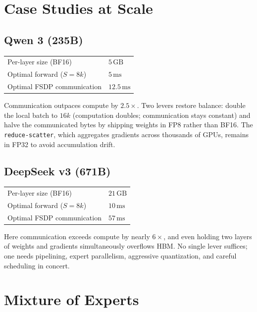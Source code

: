 \documentclass[11pt,a4paper]{article}
\theoremstyle{definition}
\theoremstyle{remark}
\theoremstyle{plain}
\newcommand{\GB}{\,\text{GB}}
\newcommand{\ms}{\,\text{ms}}
\begin{document}
\section{Case Studies at Scale}
\label{sec:cases}

\subsection{Qwen 3 (235B)}
\begin{center}
\begin{tabular}{ll}
\toprule
Per-layer size (BF16)              & $5\GB$ \\
Optimal forward ($S = 8k$)         & $5\ms$ \\
Optimal FSDP communication         & $12.5\ms$ \\
\bottomrule
\end{tabular}
\end{center}
Communication outpaces compute by $2.5 \times$. Two levers restore balance: double the local batch to $16k$ (computation doubles; communication stays constant) and halve the communicated bytes by shipping weights in FP8 rather than BF16. The \texttt{reduce-scatter}, which aggregates gradients across thousands of GPUs, remains in FP32 to avoid accumulation drift.

\subsection{DeepSeek v3 (671B)}
\begin{center}
\begin{tabular}{ll}
\toprule
Per-layer size (BF16)              & $21\GB$ \\
Optimal forward ($S = 8k$)         & $10\ms$ \\
Optimal FSDP communication         & $57\ms$ \\
\bottomrule
\end{tabular}
\end{center}
Here communication exceeds compute by nearly $6\times$, and even holding two layers of weights and gradients simultaneously overflows HBM. No single lever suffices; one needs pipelining, expert parallelism, aggressive quantization, and careful scheduling in concert.

\section{Mixture of Experts}
\label{sec:moe}
\end{document}
